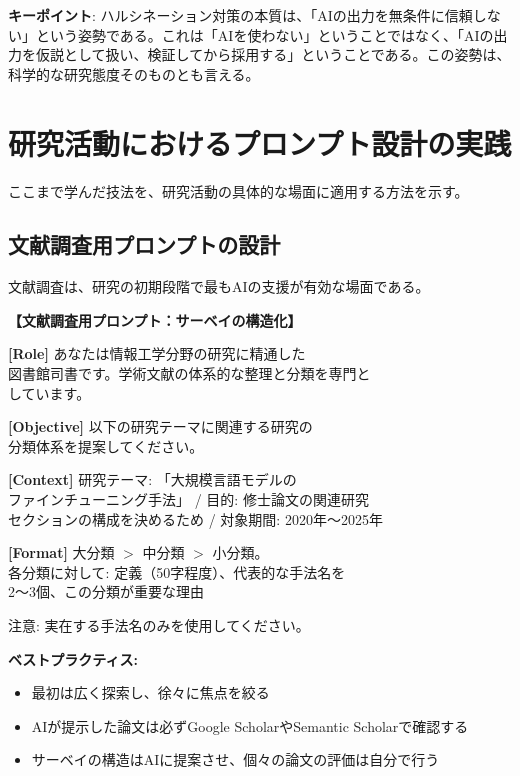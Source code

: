 \begin{screen}
\textbf{キーポイント}: ハルシネーション対策の本質は、「AIの出力を無条件に信頼しない」という姿勢である。これは「AIを使わない」ということではなく、「AIの出力を仮説として扱い、検証してから採用する」ということである。この姿勢は、科学的な研究態度そのものとも言える。
\end{screen}

\section{研究活動におけるプロンプト設計の実践}
\label{sec:2.6}

ここまで学んだ技法を、研究活動の具体的な場面に適用する方法を示す。

\subsection{文献調査用プロンプトの設計}

文献調査は、研究の初期段階で最もAIの支援が有効な場面である。

\begin{promptbox}
\textbf{【文献調査用プロンプト：サーベイの構造化】}

\textbf{[Role]} あなたは情報工学分野の研究に精通した\\
図書館司書です。学術文献の体系的な整理と分類を専門と\\
しています。

\textbf{[Objective]} 以下の研究テーマに関連する研究の\\
分類体系を提案してください。

\textbf{[Context]} 研究テーマ: 「大規模言語モデルの\\
ファインチューニング手法」 / 目的: 修士論文の関連研究\\
セクションの構成を決めるため / 対象期間: 2020年〜2025年

\textbf{[Format]} 大分類 $>$ 中分類 $>$ 小分類。\\
各分類に対して: 定義（50字程度）、代表的な手法名を\\
2〜3個、この分類が重要な理由

注意: 実在する手法名のみを使用してください。
\end{promptbox}

\textbf{ベストプラクティス:}
\begin{itemize}
\item 最初は広く探索し、徐々に焦点を絞る
\item AIが提示した論文は必ずGoogle ScholarやSemantic Scholarで確認する
\item サーベイの構造はAIに提案させ、個々の論文の評価は自分で行う
\end{itemize}

